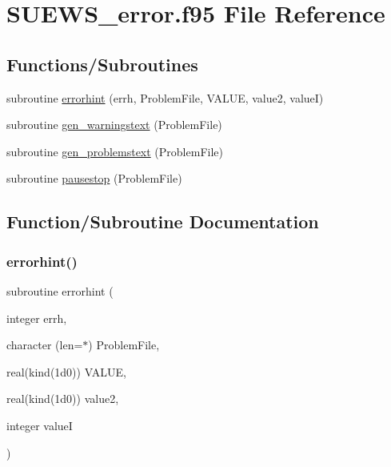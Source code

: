 \hypertarget{_s_u_e_w_s__error_8f95}{}\section{S\+U\+E\+W\+S\+\_\+error.\+f95 File Reference}
\label{_s_u_e_w_s__error_8f95}
\subsection*{Functions/\+Subroutines}
\begin{DoxyCompactItemize}
\item 
subroutine \hyperlink{_s_u_e_w_s__error_8f95_ac54090fb3ca221d8f45ec0a2a714e6c9}{errorhint} (errh, Problem\+File, V\+A\+L\+UE, value2, valueI)
\item 
subroutine \hyperlink{_s_u_e_w_s__error_8f95_a94f39ecfb93ed25b35ef27d1467e9a5f}{gen\+\_\+warningstext} (Problem\+File)
\item 
subroutine \hyperlink{_s_u_e_w_s__error_8f95_a36739091b898d2822d0668fb68791963}{gen\+\_\+problemstext} (Problem\+File)
\item 
subroutine \hyperlink{_s_u_e_w_s__error_8f95_a4b8296fcae72f02e79743ba9e6b75619}{pausestop} (Problem\+File)
\end{DoxyCompactItemize}


\subsection{Function/\+Subroutine Documentation}
\mbox{\label{_s_u_e_w_s__error_8f95_ac54090fb3ca221d8f45ec0a2a714e6c9}} 
\subsubsection{\texorpdfstring{errorhint()}{errorhint()}}
{\footnotesize\ttfamily subroutine errorhint (\begin{DoxyParamCaption}\item[{integer}]{errh,  }\item[{character (len=$\ast$)}]{Problem\+File,  }\item[{real(kind(1d0))}]{V\+A\+L\+UE,  }\item[{real(kind(1d0))}]{value2,  }\item[{integer}]{valueI }\end{DoxyParamCaption})}



